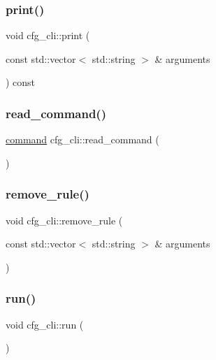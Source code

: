 \mbox{\label{classcfg__cli_add8ecd5384eb0f41173e1d13bc3a0db5}} 
\subsubsection{\texorpdfstring{print()}{print()}}
{\footnotesize\ttfamily void cfg\+\_\+cli\+::print (\begin{DoxyParamCaption}\item[{const std\+::vector$<$ std\+::string $>$ \&}]{arguments }\end{DoxyParamCaption}) const}

\mbox{\label{classcfg__cli_ad4be9b5541afca7e8604ede8d66b0859}} 
\subsubsection{\texorpdfstring{read\_command()}{read\_command()}}
{\footnotesize\ttfamily \mbox{\hyperlink{structcommand}{command}} cfg\+\_\+cli\+::read\+\_\+command (\begin{DoxyParamCaption}{ }\end{DoxyParamCaption})}

\mbox{\label{classcfg__cli_a5daa8ccbc86585416405e7d8ae06de35}} 
\subsubsection{\texorpdfstring{remove\_rule()}{remove\_rule()}}
{\footnotesize\ttfamily void cfg\+\_\+cli\+::remove\+\_\+rule (\begin{DoxyParamCaption}\item[{const std\+::vector$<$ std\+::string $>$ \&}]{arguments }\end{DoxyParamCaption})}

\mbox{\label{classcfg__cli_a4698335f2fd01d4abb19651cde3ce898}} 
\subsubsection{\texorpdfstring{run()}{run()}}
{\footnotesize\ttfamily void cfg\+\_\+cli\+::run (\begin{DoxyParamCaption}{ }\end{DoxyParamCaption})}

